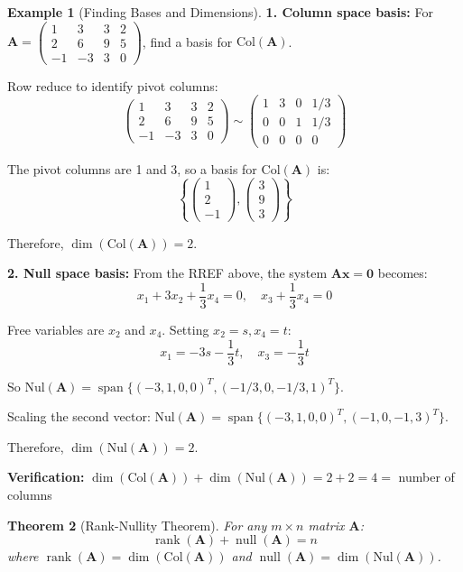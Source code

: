 \documentclass[12pt]{article}
\numberwithin{equation}{section}
\newcommand{\vect}[1]{\boldsymbol{#1}}   %
\newcommand{\mat}[1]{\mathbf{#1}}        %
\newcommand{\Span}{\operatorname{span}}
\newcommand{\rank}{\operatorname{rank}}
\newcommand{\nullity}{\operatorname{null}}
\theoremstyle{plain}
\newtheorem{theorem}{Theorem}[section]
\theoremstyle{definition}
\newtheorem{example}[theorem]{Example}
\theoremstyle{remark}
\begin{document}
\begin{example}[Finding Bases and Dimensions]
\textbf{1. Column space basis:}
For $\mat{A} = \begin{pmatrix} 1 & 3 & 3 & 2 \\ 2 & 6 & 9 & 5 \\ -1 & -3 & 3 & 0 \end{pmatrix}$, find a basis for $\text{Col}(\mat{A})$.

Row reduce to identify pivot columns:
$$\begin{pmatrix} 1 & 3 & 3 & 2 \\ 2 & 6 & 9 & 5 \\ -1 & -3 & 3 & 0 \end{pmatrix} \sim \begin{pmatrix} 1 & 3 & 0 & 1/3 \\ 0 & 0 & 1 & 1/3 \\ 0 & 0 & 0 & 0 \end{pmatrix}$$

The pivot columns are 1 and 3, so a basis for $\text{Col}(\mat{A})$ is:
$$\left\{\begin{pmatrix} 1 \\ 2 \\ -1 \end{pmatrix}, \begin{pmatrix} 3 \\ 9 \\ 3 \end{pmatrix}\right\}$$

Therefore, $\dim(\text{Col}(\mat{A})) = 2$.

\textbf{2. Null space basis:}
From the RREF above, the system $\mat{A}\vect{x} = \vect{0}$ becomes:
$$x_1 + 3x_2 + \frac{1}{3}x_4 = 0, \quad x_3 + \frac{1}{3}x_4 = 0$$

Free variables are $x_2$ and $x_4$. Setting $x_2 = s, x_4 = t$:
$$x_1 = -3s - \frac{1}{3}t, \quad x_3 = -\frac{1}{3}t$$

So $\text{Nul}(\mat{A}) = \Span\{(-3, 1, 0, 0)^T, (-1/3, 0, -1/3, 1)^T\}$.

Scaling the second vector: $\text{Nul}(\mat{A}) = \Span\{(-3, 1, 0, 0)^T, (-1, 0, -1, 3)^T\}$.

Therefore, $\dim(\text{Nul}(\mat{A})) = 2$.

\textbf{Verification:} $\dim(\text{Col}(\mat{A})) + \dim(\text{Nul}(\mat{A})) = 2 + 2 = 4 = $ number of columns \checkmark
\end{example}

\begin{theorem}[Rank-Nullity Theorem]
For any $m \times n$ matrix $\mat{A}$:
$$\rank(\mat{A}) + \nullity(\mat{A}) = n$$
where $\rank(\mat{A}) = \dim(\text{Col}(\mat{A}))$ and $\nullity(\mat{A}) = \dim(\text{Nul}(\mat{A}))$.
\end{theorem}
\end{document}
